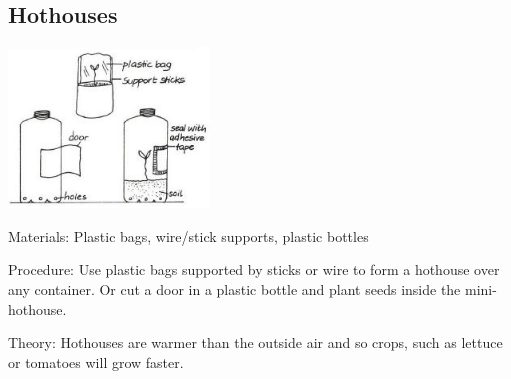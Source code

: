 \begin{multicols}{2}
\subsection{Hothouses}

\begin{center}
\includegraphics[width=0.4\textwidth]{./img/vso/hothouses.jpg}
\end{center}

\begin{description*}
\item[Materials:]{Plastic bags, wire/stick supports, plastic bottles}
\item[Procedure:]{Use plastic bags supported by
sticks or wire to form a hothouse
over any container. Or cut a door in a plastic bottle and
plant seeds inside the mini-hothouse.}
\item[Theory:]{Hothouses are warmer than the
outside air and so crops, such as
lettuce or tomatoes will grow
faster.}
\end{description*}



\end{multicols}

\pagebreak